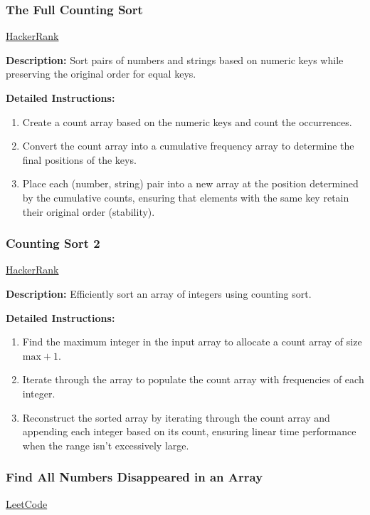 \subsubsection{The Full Counting Sort}
\href{https://www.hackerrank.com/challenges/countingsort4/problem}{HackerRank}

\textbf{Description:} Sort pairs of numbers and strings based on numeric keys while preserving the original order for equal keys.

\textbf{Detailed Instructions:}
\begin{enumerate}
    \item Create a count array based on the numeric keys and count the occurrences.
    \item Convert the count array into a cumulative frequency array to determine the final positions of the keys.
    \item Place each (number, string) pair into a new array at the position determined by the cumulative counts, ensuring that elements with the same key retain their original order (stability).
\end{enumerate}

\subsubsection{Counting Sort 2}
\href{https://www.hackerrank.com/challenges/countingsort2/problem}{HackerRank}

\textbf{Description:} Efficiently sort an array of integers using counting sort.

\textbf{Detailed Instructions:}
\begin{enumerate}
    \item Find the maximum integer in the input array to allocate a count array of size \(\text{max}+1\).
    \item Iterate through the array to populate the count array with frequencies of each integer.
    \item Reconstruct the sorted array by iterating through the count array and appending each integer based on its count, ensuring linear time performance when the range isn’t excessively large.
\end{enumerate}

\subsubsection{Find All Numbers Disappeared in an Array}
\href{https://leetcode.com/problems/find-all-numbers-disappeared-in-an-array/}{LeetCode}

